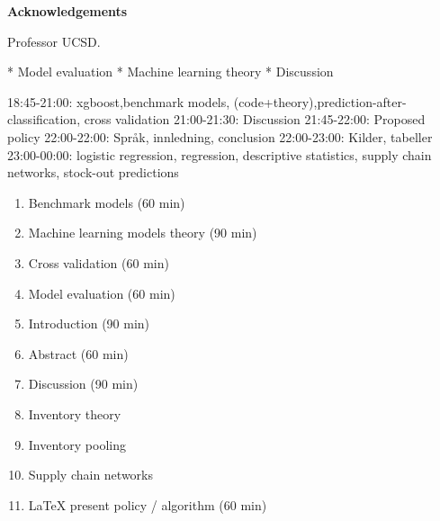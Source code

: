 \documentclass[../../main.tex]{subfiles}
\begin{document}
\thispagestyle{empty}
\newenvironment{acknowledgements}%
    {\cleardoublepage\thispagestyle{empty}\null\vfill\begin{center}%
    \vspace{0pt}
    \bfseries Acknowledgements\end{center}}%
    {\vfill\null}
        \begin{acknowledgements}

Professor UCSD.

* Model evaluation
* Machine learning theory
* Discussion

18:45-21:00: xgboost,benchmark models, (code+theory),prediction-after-classification, cross validation
21:00-21:30: Discussion
21:45-22:00: Proposed policy
22:00-22:00: Språk, innledning, conclusion
22:00-23:00: Kilder, tabeller
23:00-00:00: logistic regression, regression, descriptive statistics, supply chain networks, stock-out predictions

\begin{enumerate}
\item Benchmark models (60 min)
\item Machine learning models theory (90 min)
\item Cross validation (60 min)
\item Model evaluation (60 min)
%
\item Introduction (90 min)
\item Abstract (60 min)
\item Discussion (90 min)
\item Inventory theory
\item Inventory pooling
\item Supply chain networks
\item LaTeX present policy / algorithm (60 min)
\end{enumerate}



        \end{acknowledgements}
\end{document}
